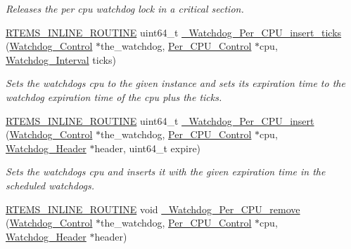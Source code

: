 \begin{DoxyCompactItemize}
\begin{DoxyCompactList}\small\item\em Releases the per cpu watchdog lock in a critical section. \end{DoxyCompactList}\item 
\mbox{\hyperlink{group__RTEMSScoreBaseDefs_gac216239df231d5dbd15e3520b0b9313f}{R\+T\+E\+M\+S\+\_\+\+I\+N\+L\+I\+N\+E\+\_\+\+R\+O\+U\+T\+I\+NE}} uint64\+\_\+t \mbox{\hyperlink{group__RTEMSScoreWatchdog_gae396749d9d59bd42fb6927ef35880661}{\+\_\+\+Watchdog\+\_\+\+Per\+\_\+\+C\+P\+U\+\_\+insert\+\_\+ticks}} (\mbox{\hyperlink{structWatchdog__Control}{Watchdog\+\_\+\+Control}} $\ast$the\+\_\+watchdog, \mbox{\hyperlink{structPer__CPU__Control}{Per\+\_\+\+C\+P\+U\+\_\+\+Control}} $\ast$cpu, \mbox{\hyperlink{group__RTEMSScoreWatchdog_gaa1834fd7531ca9bb5c4ca6fd990388d5}{Watchdog\+\_\+\+Interval}} ticks)
\begin{DoxyCompactList}\small\item\em Sets the watchdog\textquotesingle{}s cpu to the given instance and sets its expiration time to the watchdog expiration time of the cpu plus the ticks. \end{DoxyCompactList}\item 
\mbox{\hyperlink{group__RTEMSScoreBaseDefs_gac216239df231d5dbd15e3520b0b9313f}{R\+T\+E\+M\+S\+\_\+\+I\+N\+L\+I\+N\+E\+\_\+\+R\+O\+U\+T\+I\+NE}} uint64\+\_\+t \mbox{\hyperlink{group__RTEMSScoreWatchdog_gafe13ff2012b33245774dd1ccb09da175}{\+\_\+\+Watchdog\+\_\+\+Per\+\_\+\+C\+P\+U\+\_\+insert}} (\mbox{\hyperlink{structWatchdog__Control}{Watchdog\+\_\+\+Control}} $\ast$the\+\_\+watchdog, \mbox{\hyperlink{structPer__CPU__Control}{Per\+\_\+\+C\+P\+U\+\_\+\+Control}} $\ast$cpu, \mbox{\hyperlink{structWatchdog__Header}{Watchdog\+\_\+\+Header}} $\ast$header, uint64\+\_\+t expire)
\begin{DoxyCompactList}\small\item\em Sets the watchdog\textquotesingle{}s cpu and inserts it with the given expiration time in the scheduled watchdogs. \end{DoxyCompactList}\item 
\mbox{\hyperlink{group__RTEMSScoreBaseDefs_gac216239df231d5dbd15e3520b0b9313f}{R\+T\+E\+M\+S\+\_\+\+I\+N\+L\+I\+N\+E\+\_\+\+R\+O\+U\+T\+I\+NE}} void \mbox{\hyperlink{group__RTEMSScoreWatchdog_ga5634267a330e8974e3035399224cf029}{\+\_\+\+Watchdog\+\_\+\+Per\+\_\+\+C\+P\+U\+\_\+remove}} (\mbox{\hyperlink{structWatchdog__Control}{Watchdog\+\_\+\+Control}} $\ast$the\+\_\+watchdog, \mbox{\hyperlink{structPer__CPU__Control}{Per\+\_\+\+C\+P\+U\+\_\+\+Control}} $\ast$cpu, \mbox{\hyperlink{structWatchdog__Header}{Watchdog\+\_\+\+Header}} $\ast$header)

\end{DoxyCompactItemize}
